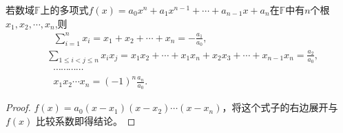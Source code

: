\documentclass[lang=cn,newtx,10pt,scheme=chinese]{elegantbook}
\begin{document}
\begin{theorem}[Vieta定理]\label{theorem:Vieta定理}
若数域\(\mathbb{F}\)上的多项式\(f(x)=a_0x^n + a_1x^{n - 1}+\cdots + a_{n - 1}x + a_n\)在\(\mathbb{F}\)中有\(n\)个根\(x_1,x_2,\cdots,x_n\),则
\begin{align*}
&\,\,\,\, \sum_{i=1}^n{x_i}=x_1+x_2+\cdots +x_n=-\frac{a_1}{a_0},
\\
&\sum_{1\le i<j\le n}{x_ix_j}=x_1x_2+\cdots +x_1x_n+x_2x_3+\cdots +x_{n-1}x_n=\frac{a_2}{a_0},
\\
&\,\,\,\, \cdots \cdots \cdots \cdots 
\\
&\,\,\,\, x_1x_2\cdots x_n=(-1)^n\frac{a_n}{a_0}.
\end{align*}
\end{theorem}
\begin{proof}
$f(x) = a_0 (x - x_1)(x - x_2) \cdots (x - x_n)$，将这个式子的右边展开与 $f(x)$ 比较系数即得结论。
\end{proof}
\end{document}
